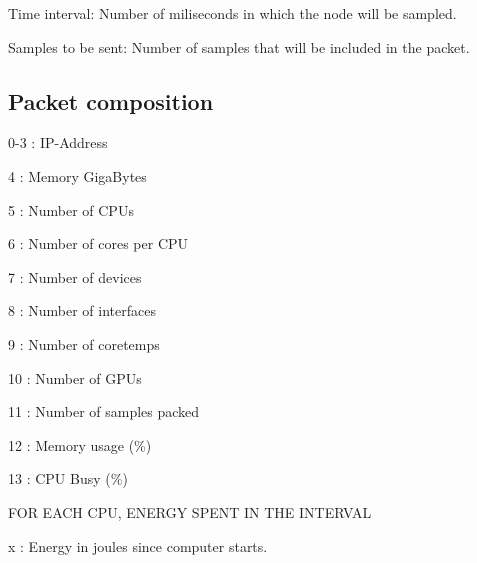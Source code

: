 \begin{DoxyItemize}
\item Time interval\+: Number of miliseconds in which the node will be sampled.
\item Samples to be sent\+: Number of samples that will be included in the packet.
\item 
\end{DoxyItemize}

\subsection*{Packet composition}


\begin{DoxyItemize}
\item 0-\/3 \+: I\+P-\/\+Address
\item 4 \+: Memory Giga\+Bytes
\item 5 \+: Number of C\+P\+Us
\item 6 \+: Number of cores per C\+PU
\item 7 \+: Number of devices
\item 8 \+: Number of interfaces
\item 9 \+: Number of coretemps
\item 10 \+: Number of G\+P\+Us
\item 11 \+: Number of samples packed
\item 12 \+: Memory usage (\%)
\item 13 \+: C\+PU Busy (\%)
\begin{DoxyItemize}
\item F\+OR E\+A\+CH C\+PU, E\+N\+E\+R\+GY S\+P\+E\+NT IN T\+HE I\+N\+T\+E\+R\+V\+AL
\begin{DoxyItemize}
\item x \+: Energy in joules since computer starts. ~\newline


\end{DoxyItemize}
\end{DoxyItemize}
\end{DoxyItemize}
